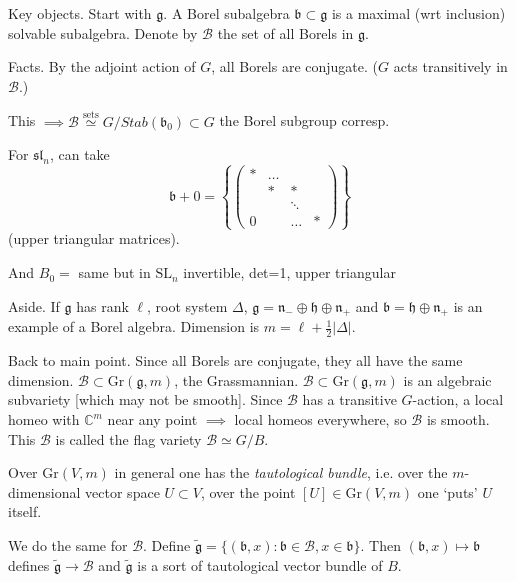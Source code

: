\medskip\noindent
Key objects. Start with $\mathfrak{g}$. A
Borel subalgebra $\mathfrak{b}\subset
\mathfrak{g}$
is a maximal (wrt inclusion) solvable
subalgebra. Denote by $\mathcal{B}$ the set
of all Borels in $\mathfrak{g}$.

\noindent
Facts. By the adjoint action of $G$, all
Borels are conjugate. ($G$ acts transitively
in $\mathcal{B}$.)

This $\implies \mathcal{B}
\overset{\text{sets}}{\simeq}G/
Stab(\mathfrak{b}_0)
\subset G$
the Borel subgroup corresp.

For $\mathfrak{sl}_n$, can take
$$
\mathfrak{b}+0=\left\{
\begin{pmatrix} \ast & \ldots{} & \\
& \ast & \ast \\
& & \ddots \\
0 & & \ldots{} & \ast\end{pmatrix} \right\}
$$
(upper triangular matrices).

And $B_0=$ same but in $\text{SL}_n$
invertible, det=1, upper triangular

\noindent
Aside. If $\mathfrak{g}$ has rank $\ell$,
root system  $\Delta$,
$\mathfrak{g}=\mathfrak{n}_-\oplus
\mathfrak{h}\oplus \mathfrak{n}_+$
and $\mathfrak{b}=\mathfrak{h} \oplus
\mathfrak{n}_+$
is an example of a Borel algebra. Dimension
is $m=\ell+\frac{1}{2}|\Delta|$.

\medskip\noindent
Back to main point. Since all Borels are
conjugate, they all have the same dimension.
$\mathcal{B}\subset
\text{Gr}(\mathfrak{g},m)$,
the Grassmannian. $\mathcal{B}\subset
\text{Gr}(\mathfrak{g},m)$ is an algebraic
subvariety [which may not be smooth]. Since
$\mathcal{B}$ has a transitive $G$-action, a
local homeo with $\mathbb{C}^m$ near any
point $\implies$ local homeos everywhere, so
$\mathcal{B}$ is smooth. This $\mathcal{B}$ is
called the flag variety $\mathcal{B} \simeq
G/B$.

Over $\text{Gr}(V,m)$ in general one has the
{\it tautological bundle}, i.e. over the
$m$-dimensional vector space $U \subset V$,
over the point $[U] \in \text{Gr}(V,m)$ one
`puts' $U$ itself.

\medskip\noindent
We do the same for $\mathcal{B}$. Define
$\tilde{\mathfrak{g}}=
\{(\mathfrak{b},x):\mathfrak{b} \in
\mathcal{B}, x \in \mathfrak{b}\}$.
Then $(\mathfrak{b},x) \mapsto  \mathfrak{b}$
defines $\tilde{\mathfrak{g}}\to \mathcal{B}$
and $\tilde{\mathfrak{g}}$ is a sort of
tautological vector bundle of $B$.


